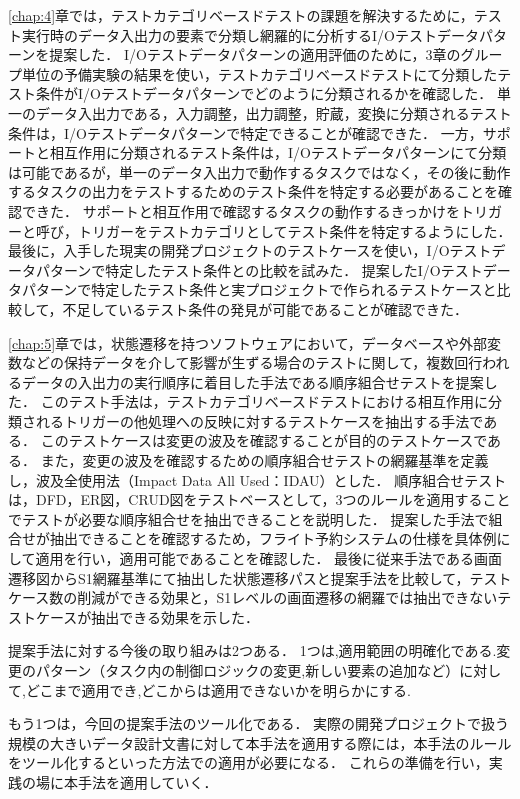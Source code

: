 \ref{chap:4}章では，テストカテゴリベースドテストの課題を解決するために，テスト実行時のデータ入出力の要素で分類し網羅的に分析するI/Oテストデータパターンを提案した．
I/Oテストデータパターンの適用評価のために，3章のグループ単位の予備実験の結果を使い，テストカテゴリベースドテストにて分類したテスト条件がI/Oテストデータパターンでどのように分類されるかを確認した．
単一のデータ入出力である，入力調整，出力調整，貯蔵，変換に分類されるテスト条件は，I/Oテストデータパターンで特定できることが確認できた．
一方，サポートと相互作用に分類されるテスト条件は，I/Oテストデータパターンにて分類は可能であるが，単一のデータ入出力で動作するタスクではなく，その後に動作するタスクの出力をテストするためのテスト条件を特定する必要があることを確認できた．
サポートと相互作用で確認するタスクの動作するきっかけをトリガーと呼び，トリガーをテストカテゴリとしてテスト条件を特定するようにした．
最後に，入手した現実の開発プロジェクトのテストケースを使い，I/Oテストデータパターンで特定したテスト条件との比較を試みた．
提案したI/Oテストデータパターンで特定したテスト条件と実プロジェクトで作られるテストケースと比較して，不足しているテスト条件の発見が可能であることが確認できた．

\ref{chap:5}章では，状態遷移を持つソフトウェアにおいて，データベースや外部変数などの保持データを介して影響が生ずる場合のテストに関して，複数回行われるデータの入出力の実行順序に着目した手法である順序組合せテストを提案した．
このテスト手法は，テストカテゴリベースドテストにおける相互作用に分類されるトリガーの他処理への反映に対するテストケースを抽出する手法である．
このテストケースは変更の波及を確認することが目的のテストケースである．
また，変更の波及を確認するための順序組合せテストの網羅基準を定義し，波及全使用法（Impact Data All Used：IDAU）とした．
順序組合せテストは，DFD，ER図，CRUD図をテストベースとして，3つのルールを適用することでテストが必要な順序組合せを抽出できることを説明した．
提案した手法で組合せが抽出できることを確認するため，フライト予約システムの仕様を具体例にして適用を行い，適用可能であることを確認した．
最後に従来手法である画面遷移図からS1網羅基準にて抽出した状態遷移パスと提案手法を比較して，テストケース数の削減ができる効果と，S1レベルの画面遷移の網羅では抽出できないテストケースが抽出できる効果を示した．

提案手法に対する今後の取り組みは2つある．
1つは,適用範囲の明確化である.変更のパターン（タスク内の制御ロジックの変更,新しい要素の追加など）に対して,どこまで適用でき,どこからは適用できないかを明らかにする.

もう1つは，今回の提案手法のツール化である．
実際の開発プロジェクトで扱う規模の大きいデータ設計文書に対して本手法を適用する際には，本手法のルールをツール化するといった方法での適用が必要になる．
これらの準備を行い，実践の場に本手法を適用していく．

